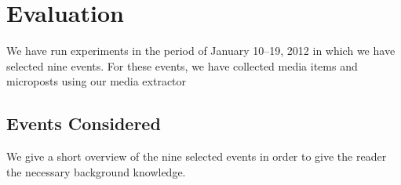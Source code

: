 \section{Evaluation}
\label{sec:evaluation}

We have run experiments in the period of January 10--19, 2012
in which we have selected nine events.
For these events, we have collected media items and microposts
using our media extractor

\subsection{Events Considered}

We give a short overview of the nine selected events
in order to give the reader the necessary background knowledge.

